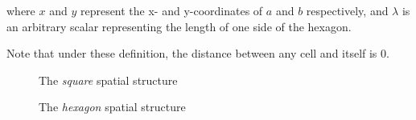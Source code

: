 where $x$ and $y$ represent the x- and y-coordinates of $a$ and $b$ respectively, and $\lambda$ is an arbitrary scalar representing the length of one side of the hexagon. 

Note that under these definition, the distance between any cell and itself is 0.


\begin{figure}[htp]
 \caption{The \emph{square} spatial structure}
 \label{fig:SquareSpatialStructure}
\end{figure}

\begin{figure}[htp]
 \caption{The \emph{hexagon} spatial structure}
 \label{fig:HexagonSpatialStructure}
\end{figure}

